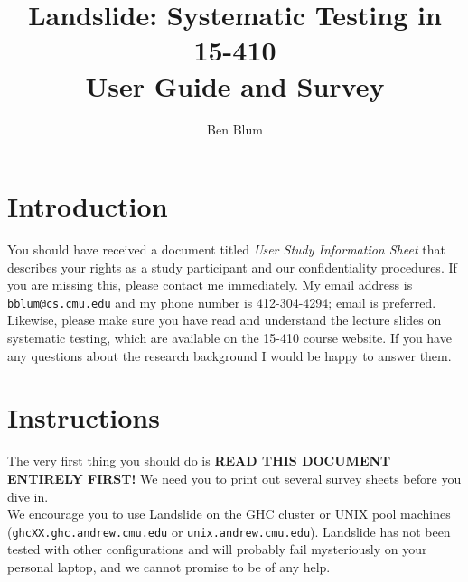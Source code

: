 \documentclass{article}
\begin{document}

\title{\bf Landslide: Systematic Testing in 15-410 \\ User Guide and Survey}
\author{Ben Blum}
\date{}
\maketitle

\section{Introduction}

%

\noindent You should have received a document titled {\em User Study Information Sheet} that describes your rights as a study participant and our confidentiality procedures. If you are missing this, please contact me immediately. My email address is {\tt bblum@cs.cmu.edu} and my phone number is 412-304-4294; email is preferred.
\\

\noindent Likewise, please make sure you have read and understand the lecture slides on systematic testing, which are available on the 15-410 course website. If you have any questions about the research background I would be happy to answer them.

\section{Instructions}

The very first thing you should do is {\bf READ THIS DOCUMENT ENTIRELY FIRST!} We need you to print out several survey sheets before you dive in.
\\

\noindent We encourage you to use Landslide on the GHC cluster or UNIX pool machines ({\tt ghcXX.ghc.andrew.cmu.edu} or {\tt unix.andrew.cmu.edu}). Landslide has not been tested with other configurations and will probably fail mysteriously on your personal laptop, and we cannot promise to be of any help.
\end{document}
